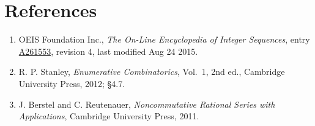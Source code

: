 \documentclass[11pt]{article}
\theoremstyle{definition}
\begin{document}
\section{References}

\begin{enumerate}

\item OEIS Foundation Inc., \emph{The On-Line Encyclopedia of Integer Sequences}, entry \href{https://oeis.org/A261553}{A261553}, revision 4, last modified Aug 24 2015.

\item R. P. Stanley, \emph{Enumerative Combinatorics}, Vol.~1, 2nd ed., Cambridge University Press, 2012; \S4.7.

\item J. Berstel and C. Reutenauer, \emph{Noncommutative Rational Series with Applications}, Cambridge University Press, 2011.

\end{enumerate}
\end{document}
